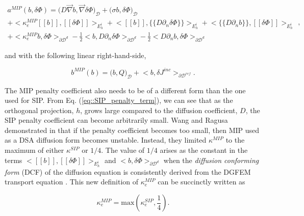 \begin{equation}
\label{eq::MIP_bilinear_form}
\begin{aligned}
a^{MIP}(b, \delta \Phi)  = \Big(  D \vec{\nabla} b , \vec{\nabla} \delta \Phi  \Big)_{\mathcal{D}} + \Big(  \sigma b , \delta \Phi  \Big)_{\mathcal{D}}    \\
+  \Big< \kappa_e^{MIP} [\![   b ]\!] , [\![  \delta \Phi ]\!]\Big>_{E_h^i} + \Big<  [\![  b ]\!] , \{\!\{  D \partial_n \delta \Phi \}\!\}\Big>_{E_h^i}  + \Big< \{\!\{  D \partial_n b \}\!\} , [\![ \delta \Phi ]\!]\Big>_{E_h^i} \\
+ \Big< \kappa_e^{MIP}  b , \delta  \Phi \Big>_{\partial \mathcal{D}^d} - \frac{1}{2} \Big<  b ,  D \partial_n \delta \Phi \Big>_{\partial \mathcal{D}^d} - \frac{1}{2} \Big<   D \partial_n b , \delta \Phi \Big>_{\partial \mathcal{D}^d}  
\end{aligned} ,
\end{equation}

\noindent and with the following linear right-hand-side,

\begin{equation}
\label{eq::MIP_linear_form}
b^{MIP} (b) = \Big(  b, Q  \Big)_{\mathcal{D}}  + \Big< b, \delta  J^{inc}  \Big>_{\partial \mathcal{D}^{ref}} .
\end{equation}

\noindent The MIP penalty coefficient also needs to be of a different form than the one used for SIP. From Eq. (\ref{eq::SIP_penalty_term}), we can see that as the orthogonal projection, $h$, grows large compared to the diffusion coefficient, $D$, the SIP penalty coefficient can become arbitrarily small. Wang and Ragusa demonstrated in \cite{ragusa2010two} that if the penalty coefficient becomes too small, then MIP used as a DSA diffusion form becomes unstable. Instead, they limited $\kappa^{MIP}$ to the maximum of either $\kappa^{SIP}$ or $1/4$. The value of $1/4$ arises as the constant in the terms $\Big<  [\![   b ]\!] , [\![  \delta \Phi ]\!]\Big>_{E_h^i} $ and $\Big<  b , \delta  \Phi \Big>_{\partial \mathcal{D}^d}$ when the {\em diffusion conforming form} (DCF) of the diffusion equation is consistently derived from the DGFEM transport equation \cite{ref::DSA_wang_ragusa}. This new definition of $\kappa_e^{MIP}$ can be succinctly written as

\begin{equation}
\label{eq::MIP_penalty_term}
\kappa_e^{MIP} = \text{max} \left( \kappa_e^{SIP}, \frac{1}{4} \right).
\end{equation}

